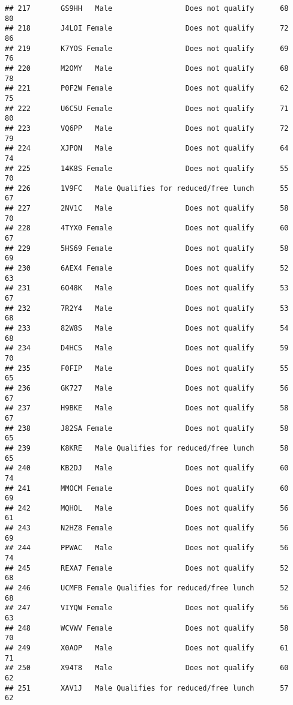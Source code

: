 \documentclass[
]{article}
\begin{document}
\begin{verbatim}
## 217       GS9HH   Male                 Does not qualify      68       80
## 218       J4LOI Female                 Does not qualify      72       86
## 219       K7YOS Female                 Does not qualify      69       76
## 220       M2OMY   Male                 Does not qualify      68       78
## 221       P0F2W Female                 Does not qualify      62       75
## 222       U6C5U Female                 Does not qualify      71       80
## 223       VQ6PP   Male                 Does not qualify      72       79
## 224       XJPON   Male                 Does not qualify      64       74
## 225       14K8S Female                 Does not qualify      55       70
## 226       1V9FC   Male Qualifies for reduced/free lunch      55       67
## 227       2NV1C   Male                 Does not qualify      58       70
## 228       4TYX0 Female                 Does not qualify      60       67
## 229       5HS69 Female                 Does not qualify      58       69
## 230       6AEX4 Female                 Does not qualify      52       63
## 231       6O48K   Male                 Does not qualify      53       67
## 232       7R2Y4   Male                 Does not qualify      53       68
## 233       82W8S   Male                 Does not qualify      54       68
## 234       D4HCS   Male                 Does not qualify      59       70
## 235       F0FIP   Male                 Does not qualify      55       65
## 236       GK727   Male                 Does not qualify      56       67
## 237       H9BKE   Male                 Does not qualify      58       67
## 238       J82SA Female                 Does not qualify      58       65
## 239       K8KRE   Male Qualifies for reduced/free lunch      58       65
## 240       KB2DJ   Male                 Does not qualify      60       74
## 241       MMOCM Female                 Does not qualify      60       69
## 242       MQHOL   Male                 Does not qualify      56       61
## 243       N2HZ8 Female                 Does not qualify      56       69
## 244       PPWAC   Male                 Does not qualify      56       74
## 245       REXA7 Female                 Does not qualify      52       68
## 246       UCMFB Female Qualifies for reduced/free lunch      52       68
## 247       VIYQW Female                 Does not qualify      56       63
## 248       WCVWV Female                 Does not qualify      58       70
## 249       X0AOP   Male                 Does not qualify      61       71
## 250       X94T8   Male                 Does not qualify      60       62
## 251       XAV1J   Male Qualifies for reduced/free lunch      57       62

\end{verbatim}
\end{document}
